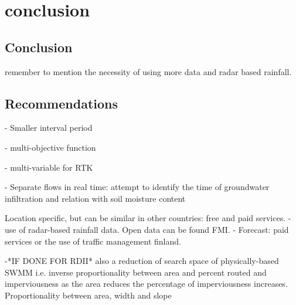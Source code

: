 \chapter{conclusion}

\section{Conclusion}


remember to mention the necessity of using more data and radar based rainfall. 

\section{Recommendations}


- Smaller interval period

- multi-objective function

- multi-variable for RTK

- Separate flows in real time: attempt to identify the time of groundwater infiltration and relation with soil moisture content


Location specific, but can be similar in other countries: free and paid services.
- use of radar-based rainfall data. Open data can be found FMI. 
- Forecast: paid services or the use of traffic management finland.


-*IF DONE FOR RDII* also a reduction of search space of physically-based SWMM i.e. inverse proportionality between area and percent routed and imperviousness as the area reduces the percentage of imperviousness increases. Proportionality between area, width and slope
